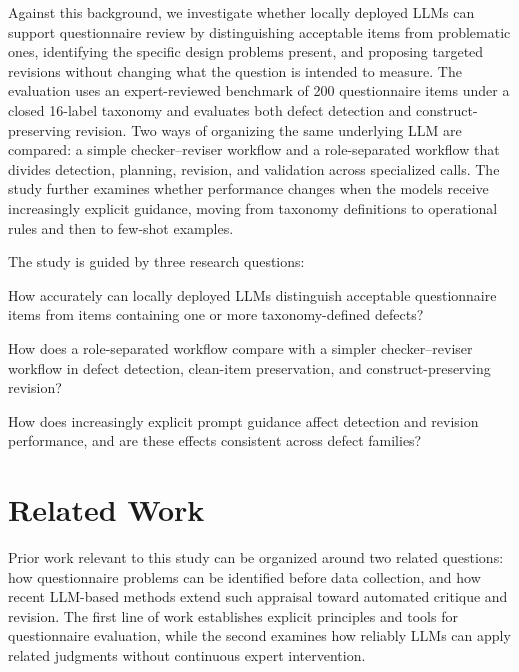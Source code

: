 \documentclass[11pt,a4paper]{article}
\begin{document}
Against this background, we investigate whether locally deployed LLMs can support
questionnaire review by distinguishing acceptable items from problematic ones,
identifying the specific design problems present, and proposing targeted revisions
without changing what the question is intended to measure. The evaluation uses an
expert-reviewed benchmark of 200 questionnaire items under a closed 16-label
taxonomy and evaluates both defect detection and construct-preserving revision.
Two ways of organizing the same underlying LLM are compared: a simple
checker--reviser workflow and a role-separated workflow that divides detection,
planning, revision, and validation across specialized calls. The study further
examines whether performance changes when the models receive increasingly explicit
guidance, moving from taxonomy definitions to operational rules and then to
few-shot examples.

The study is guided by three research questions:
\begin{tcolorbox}[
    colback=blue!1!white,
    colframe=accentblue!90!black,
    title=Research Questions,
    fonttitle=\bfseries,
    coltitle=white,
    boxrule=0.7pt,
    arc=2mm
]
\begin{description}[
    style=nextline,
    leftmargin=1.7cm,
    labelwidth=1.2cm,
    font=\bfseries,
    itemsep=5pt
]
    \item[RQ1:] How accurately can locally deployed LLMs distinguish acceptable
    questionnaire items from items containing one or more taxonomy-defined defects?

    \item[RQ2:] How does a role-separated workflow compare with a simpler
    checker--reviser workflow in defect detection, clean-item preservation, and
    construct-preserving revision?

    \item[RQ3:] How does increasingly explicit prompt guidance affect detection and
    revision performance, and are these effects consistent across defect families?
\end{description}
\end{tcolorbox}


\section{Related Work}
\label{sec:related-work}

Prior work relevant to this study can be organized around two related questions:
how questionnaire problems can be identified before data collection, and how recent
LLM-based methods extend such appraisal toward automated critique and revision.
The first line of work establishes explicit principles and tools for questionnaire
evaluation, while the second examines how reliably LLMs can apply related judgments
without continuous expert intervention.
\end{document}
